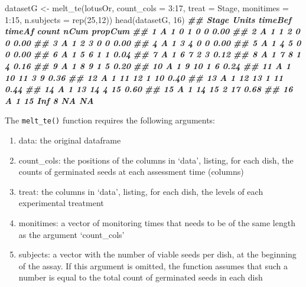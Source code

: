 \documentclass[
]{book}
\newenvironment{Shaded}{\begin{snugshade}}{\end{snugshade}}
\newcommand{\AttributeTok}[1]{\textcolor[rgb]{0.77,0.63,0.00}{#1}}
\newcommand{\DecValTok}[1]{\textcolor[rgb]{0.00,0.00,0.81}{#1}}
\newcommand{\DocumentationTok}[1]{\textcolor[rgb]{0.56,0.35,0.01}{\textbf{\textit{#1}}}}
\newcommand{\FunctionTok}[1]{\textcolor[rgb]{0.00,0.00,0.00}{#1}}
\newcommand{\NormalTok}[1]{#1}
\newcommand{\OtherTok}[1]{\textcolor[rgb]{0.56,0.35,0.01}{#1}}
\newcommand{\SpecialCharTok}[1]{\textcolor[rgb]{0.00,0.00,0.00}{#1}}
\providecommand{\tightlist}{%
  \setlength{\itemsep}{0pt}\setlength{\parskip}{0pt}}
\begin{document}
\begin{Shaded}
\begin{Highlighting}[]
\NormalTok{datasetG }\OtherTok{\textless{}{-}} \FunctionTok{melt\_te}\NormalTok{(lotusOr, }\AttributeTok{count\_cols =} \DecValTok{3}\SpecialCharTok{:}\DecValTok{17}\NormalTok{, }\AttributeTok{treat =}\NormalTok{ Stage, }
                   \AttributeTok{monitimes =} \DecValTok{1}\SpecialCharTok{:}\DecValTok{15}\NormalTok{, }\AttributeTok{n.subjects =} \FunctionTok{rep}\NormalTok{(}\DecValTok{25}\NormalTok{,}\DecValTok{12}\NormalTok{))}
\FunctionTok{head}\NormalTok{(datasetG, }\DecValTok{16}\NormalTok{)}
\DocumentationTok{\#\#    Stage Units timeBef timeAf count nCum propCum}
\DocumentationTok{\#\# 1      A     1       0      1     0    0    0.00}
\DocumentationTok{\#\# 2      A     1       1      2     0    0    0.00}
\DocumentationTok{\#\# 3      A     1       2      3     0    0    0.00}
\DocumentationTok{\#\# 4      A     1       3      4     0    0    0.00}
\DocumentationTok{\#\# 5      A     1       4      5     0    0    0.00}
\DocumentationTok{\#\# 6      A     1       5      6     1    1    0.04}
\DocumentationTok{\#\# 7      A     1       6      7     2    3    0.12}
\DocumentationTok{\#\# 8      A     1       7      8     1    4    0.16}
\DocumentationTok{\#\# 9      A     1       8      9     1    5    0.20}
\DocumentationTok{\#\# 10     A     1       9     10     1    6    0.24}
\DocumentationTok{\#\# 11     A     1      10     11     3    9    0.36}
\DocumentationTok{\#\# 12     A     1      11     12     1   10    0.40}
\DocumentationTok{\#\# 13     A     1      12     13     1   11    0.44}
\DocumentationTok{\#\# 14     A     1      13     14     4   15    0.60}
\DocumentationTok{\#\# 15     A     1      14     15     2   17    0.68}
\DocumentationTok{\#\# 16     A     1      15    Inf     8   NA      NA}
\end{Highlighting}
\end{Shaded}

The \texttt{melt\_te()} function requires the following arguments:

\begin{enumerate}
\def\labelenumi{\arabic{enumi}.}
\tightlist
\item
  data: the original dataframe
\item
  count\_cols: the positions of the columns in `data', listing, for each dish, the counts of germinated seeds at each assessment time (columns)
\item
  treat: the columns in `data', listing, for each dish, the levels of each experimental treatment
\item
  monitimes: a vector of monitoring times that needs to be of the same length as the argument `count\_cols'
\item
  subjects: a vector with the number of viable seeds per dish, at the beginning of the assay. If this argument is omitted, the function assumes that such a number is equal to the total count of germinated seeds in each dish
\end{enumerate}
\end{document}
